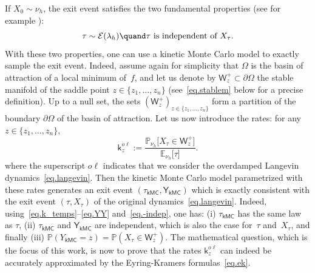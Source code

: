 If $X_0\sim \nu_h$, the exit event satisfies the two fundamental properties (see
for example \cite[Prop.\,2.4]{le2012mathematical}):
\begin{equation}\label{eq.-indep}
\tau\sim\mathcal E(\lambda_h) \quand \tau \text{ is independent of } X_{\tau}.
\end{equation}
With these two properties, one can use a kinetic Monte Carlo model to
exactly sample the exit event. Indeed, assume again for simplicity that $\Omega$ is
the basin of attraction of a local minimum of~$f$, and let us denote
by $\mathsf W_z^+ \subset \partial \Omega$ the stable manifold of the
saddle point $z \in \{z_1, \dots, z_n\}$ (see~\eqref{eq.stablem} below
for a
precise definition). Up to a null set, the sets
$(\mathsf W_z^+)_{z \in \{z_1, \ldots, z_n\}}$ form a partition of the
boundary $\partial \Omega$ of the basin
of attraction. Let us now introduce the rates: for any $z \in
\{z_1, \ldots, z_n\}$,
\begin{equation}\label{eq:rates}
\mathsf k_{z}^{o\ell}:=\frac{\mathbb P_{\nu_{h}}\big [
X_{\tau} \in \mathsf W^+_{z} \big]}{\mathbb E_{\nu_{h}}\big [ \tau \big]}.
\end{equation}
where the superscript $o\ell$ indicates that we consider the
overdamped Langevin dynamics~\eqref{eq.langevin}. Then the kinetic
Monte Carlo model parametrized with these rates generates an exit event
$(\tau_{\mathsf {kMC}}, \mathsf Y_{\mathsf {kMC}})$ which is exactly
consistent with the exit event $(\tau,X_\tau)$ of the original
dynamics~\eqref{eq.langevin}. Indeed, using~\eqref{eq.k_temps}--\eqref{eq.YY}
and~\eqref{eq.-indep}, one has: (i) $\tau_{\mathsf {kMC}}$ has the same law as $\tau$,
(ii) $\tau_{\mathsf {kMC}}$ and $\mathsf Y_{\mathsf {kMC}}$ are
independent, which is also the case for~$\tau$ and~$X_\tau$, and finally (iii)
$\mathbb P(Y_{\mathsf {kMC}}=z)=\mathbb P(X_{\tau} \in \mathsf W^+_{z})$. The
mathematical question, which is the focus of this work, is now to
prove that the rates $\mathsf k_{z}^{o\ell}$ can indeed be accurately
approximated by the Eyring-Kramers formulas~\eqref{eq.ek}.

